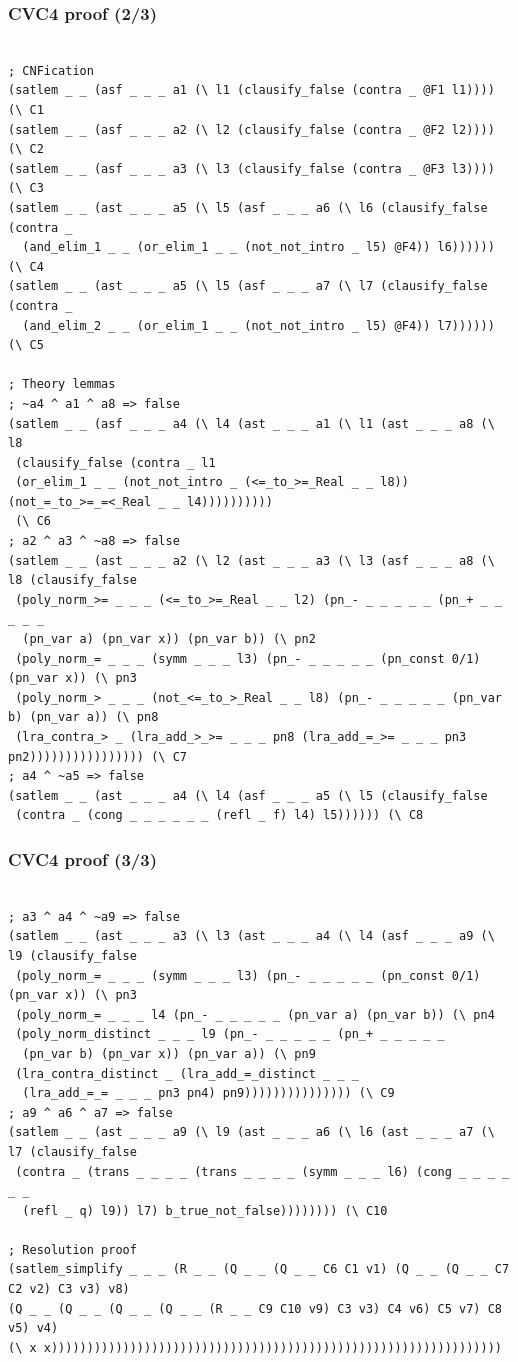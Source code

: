 \documentclass[svgnames,table,mathserif]{beamer}
\begin{document}
\begin{frame}[fragile]
\frametitle{CVC4 proof (2/3)}

{\tiny
\begin{verbatim}

; CNFication
(satlem _ _ (asf _ _ _ a1 (\ l1 (clausify_false (contra _ @F1 l1)))) (\ C1 
(satlem _ _ (asf _ _ _ a2 (\ l2 (clausify_false (contra _ @F2 l2)))) (\ C2 
(satlem _ _ (asf _ _ _ a3 (\ l3 (clausify_false (contra _ @F3 l3)))) (\ C3
(satlem _ _ (ast _ _ _ a5 (\ l5 (asf _ _ _ a6 (\ l6 (clausify_false (contra _
  (and_elim_1 _ _ (or_elim_1 _ _ (not_not_intro _ l5) @F4)) l6)))))) (\ C4
(satlem _ _ (ast _ _ _ a5 (\ l5 (asf _ _ _ a7 (\ l7 (clausify_false (contra _
  (and_elim_2 _ _ (or_elim_1 _ _ (not_not_intro _ l5) @F4)) l7)))))) (\ C5

; Theory lemmas
; ~a4 ^ a1 ^ a8 => false
(satlem _ _ (asf _ _ _ a4 (\ l4 (ast _ _ _ a1 (\ l1 (ast _ _ _ a8 (\ l8
 (clausify_false (contra _ l1
 (or_elim_1 _ _ (not_not_intro _ (<=_to_>=_Real _ _ l8)) (not_=_to_>=_=<_Real _ _ l4))))))))))
 (\ C6 
; a2 ^ a3 ^ ~a8 => false
(satlem _ _ (ast _ _ _ a2 (\ l2 (ast _ _ _ a3 (\ l3 (asf _ _ _ a8 (\ l8 (clausify_false
 (poly_norm_>= _ _ _ (<=_to_>=_Real _ _ l2) (pn_- _ _ _ _ _ (pn_+ _ _ _ _ _
  (pn_var a) (pn_var x)) (pn_var b)) (\ pn2
 (poly_norm_= _ _ _ (symm _ _ _ l3) (pn_- _ _ _ _ _ (pn_const 0/1) (pn_var x)) (\ pn3
 (poly_norm_> _ _ _ (not_<=_to_>_Real _ _ l8) (pn_- _ _ _ _ _ (pn_var b) (pn_var a)) (\ pn8
 (lra_contra_> _ (lra_add_>_>= _ _ _ pn8 (lra_add_=_>= _ _ _ pn3 pn2)))))))))))))))) (\ C7
; a4 ^ ~a5 => false
(satlem _ _ (ast _ _ _ a4 (\ l4 (asf _ _ _ a5 (\ l5 (clausify_false
 (contra _ (cong _ _ _ _ _ _ (refl _ f) l4) l5)))))) (\ C8
\end{verbatim}
}
\end{frame}

\begin{frame}[fragile]
\frametitle{CVC4 proof (3/3)}

{\tiny
\begin{verbatim}

; a3 ^ a4 ^ ~a9 => false
(satlem _ _ (ast _ _ _ a3 (\ l3 (ast _ _ _ a4 (\ l4 (asf _ _ _ a9 (\ l9 (clausify_false
 (poly_norm_= _ _ _ (symm _ _ _ l3) (pn_- _ _ _ _ _ (pn_const 0/1) (pn_var x)) (\ pn3
 (poly_norm_= _ _ _ l4 (pn_- _ _ _ _ _ (pn_var a) (pn_var b)) (\ pn4
 (poly_norm_distinct _ _ _ l9 (pn_- _ _ _ _ _ (pn_+ _ _ _ _ _
  (pn_var b) (pn_var x)) (pn_var a)) (\ pn9
 (lra_contra_distinct _ (lra_add_=_distinct _ _ _
  (lra_add_=_= _ _ _ pn3 pn4) pn9))))))))))))))) (\ C9
; a9 ^ a6 ^ a7 => false
(satlem _ _ (ast _ _ _ a9 (\ l9 (ast _ _ _ a6 (\ l6 (ast _ _ _ a7 (\ l7 (clausify_false
 (contra _ (trans _ _ _ _ (trans _ _ _ _ (symm _ _ _ l6) (cong _ _ _ _ _ _
  (refl _ q) l9)) l7) b_true_not_false)))))))) (\ C10

; Resolution proof
(satlem_simplify _ _ _ (R _ _ (Q _ _ (Q _ _ C6 C1 v1) (Q _ _ (Q _ _ C7 C2 v2) C3 v3) v8)
(Q _ _ (Q _ _ (Q _ _ (Q _ _ (R _ _ C9 C10 v9) C3 v3) C4 v6) C5 v7) C8 v5) v4)
(\ x x)))))))))))))))))))))))))))))))))))))))))))))))))))))))))))))))
\end{verbatim}
}

\end{frame}
\end{document}
